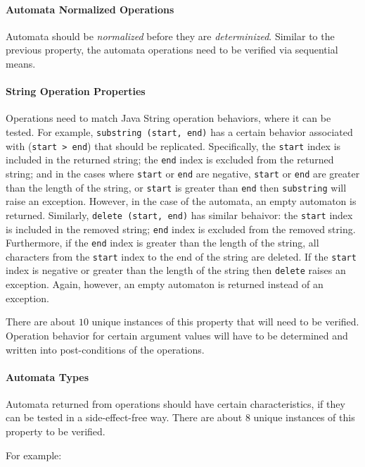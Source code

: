 \documentclass[letterpaper,11pt,twocolumn]{article}
\begin{document}
\paragraph{Automata Normalized Operations} Automata should be
\textit{normalized} before they are \textit{determinized}.  Similar to the
previous property, the automata operations need to be verified via sequential
means.

\paragraph{String Operation Properties} Operations need to match Java String
operation behaviors, where it can be tested.  For example,
\texttt{substring~(start, end)} has a certain behavior associated with
(\texttt{start > end}) that should be replicated.  Specifically, the
\texttt{start} index is included in the returned string; the \texttt{end} index
is excluded from the returned string; and in the cases where \texttt{start} or
\texttt{end} are negative, \texttt{start} or \texttt{end} are greater than the
length of the string, or \texttt{start} is greater than \texttt{end} then
\texttt{substring} will raise an exception.  However, in the case of the
automata, an empty automaton is returned.  Similarly, \texttt{delete~(start,
  end)} has similar behaivor: the \texttt{start} index is included in the
removed string; \texttt{end} index is excluded from the removed string.
Furthermore, if the \texttt{end} index is greater than the length of the
string, all characters from the \texttt{start} index to the end of the string
are deleted.  If the \texttt{start} index is negative or greater than the
length of the string then \texttt{delete} raises an exception.  Again, however,
an empty automaton is returned instead of an exception.

There are about \(10\) unique instances of this property that will need to be
verified.  Operation behavior for certain argument values will have to be
determined and written into post-conditions of the operations.

\paragraph{Automata Types} Automata returned from operations should have certain
characteristics, if they can be tested in a side-effect-free way.  There are
about \(8\) unique instances of this property to be verified.

For example:
\end{document}
